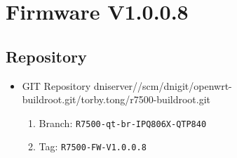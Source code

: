 \documentclass[12pt]{report}
\newcommand{\tlabel}[1]{
  \label{#1}%
  }
\begin{document}
\section{Firmware V1.0.0.8}

\tlabel{sec:1-0-1}
\subsection{Repository}
\begin{itemize}
	\item GIT Repository dniserver//scm/dnigit/openwrt-buildroot.git/torby.tong/r7500-buildroot.git
	\begin{enumerate}
		\item Branch: \texttt{R7500-qt-br-IPQ806X-QTP840}
                \item Tag: \texttt{R7500-FW-V1.0.0.8}
	\end{enumerate}
\end{itemize}
\end{document}
